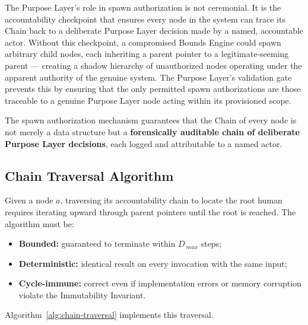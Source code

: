 The Purpose Layer's role in spawn authorization is not ceremonial. It is the accountability checkpoint that ensures every node in the system can trace its Chain back to a deliberate Purpose Layer decision made by a named, accountable actor. Without this checkpoint, a compromised Bounds Engine could spawn arbitrary child nodes, each inheriting a parent pointer to a legitimate-seeming parent --- creating a shadow hierarchy of unauthorized nodes operating under the apparent authority of the genuine system. The Purpose Layer's validation gate prevents this by ensuring that the only permitted spawn authorizations are those traceable to a genuine Purpose Layer node acting within its provisioned scope.

The spawn authorization mechanism guarantees that the Chain of every node is not merely a data structure but a \textbf{forensically auditable chain of deliberate Purpose Layer decisions}, each logged and attributable to a named actor.

\subsection{Chain Traversal Algorithm}
\label{sec:chain-traversal-algorithm}

Given a node $a$, traversing its accountability chain to locate the root human requires iterating upward through parent pointers until the root is reached. The algorithm must be:
\begin{itemize}
\item \textbf{Bounded:} guaranteed to terminate within $D_{\ max}$ steps;
\item \textbf{Deterministic:} identical result on every invocation with the same input;
\item \textbf{Cycle-immune:} correct even if implementation errors or memory corruption violate the Immutability Invariant.
\end{itemize}

Algorithm~\ref{alg:chain-traversal} implements this traversal.

